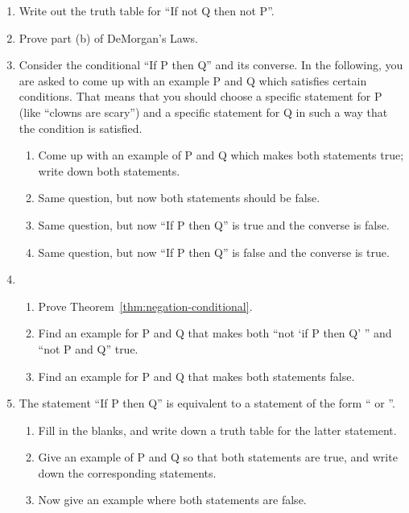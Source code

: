 \probsec{~\ref{sec:negat-logic-equiv}}
\begin{enumerate}
    \item Write out the truth table for ``If not Q then not P''.

    \item Prove part (b) of DeMorgan's Laws.

    \item Consider the conditional ``If P then Q'' and its converse. In the following, you are asked to come up with an example P and Q which satisfies certain conditions. That means that you should choose a specific statement for P (like ``clowns are scary'') and a specific statement for Q in such a way that the condition is satisfied.
  \begin{enumerate}
      \item Come up with an example of P and Q which makes both statements true; write down both statements.
      \item Same question, but now both statements should be false.
      \item Same question, but now ``If P then Q'' is true and the converse is false.
      \item Same question, but now ``If P then Q'' is false and the converse is true.
  \end{enumerate}

    \item 
  \begin{enumerate}
      \item Prove Theorem~\ref{thm:negation-conditional}.
      \item Find an example for P and Q that makes both ``not `if P then Q' '' and ``not P and Q'' true.
      \item Find an example for P and Q that makes both statements false.
  \end{enumerate}

    \item The statement ``If P then Q'' is equivalent to a statement of the form ``\underline{\hspace{.5in}} or \underline{\hspace{.5in}}''.
  \begin{enumerate}
      \item Fill in the blanks, and write down a truth table for the latter statement.
      \item Give an example of P and Q so that both statements are true, and write down the corresponding statements.
      \item Now give an example where both statements are false.
  \end{enumerate}

\end{enumerate}
